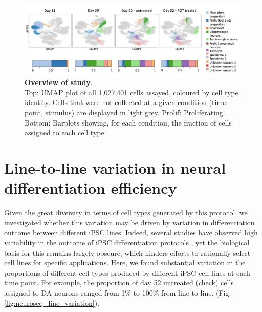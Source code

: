 \begin{figure}[h]
\centering
\includegraphics[width=17cm]{Chapter5/Fig/neuroseq_overview.png}
\caption[Overview of study]{\textbf{Overview of study}.\\
Top: UMAP plot of all 1,027,401 cells assayed, coloured by 
cell type identity. 
Cells that were not collected at a given condition (time point, stimulus) are displayed in light grey. 
Prolif: Proliferating. 
Bottom: Barplots showing, for each condition, the fraction of cells assigned to each cell type.}
\label{fig:neuroseq_overview}
\end{figure}


\newpage

\section{Line-to-line variation in neural differentiation efficiency}
\label{sec:neuroseq_diff_eff}

Given the great diversity in terms of cell types generated by this protocol, we investigated whether this variation may be driven by variation in differentiation outcome between different iPSC lines. 
Indeed, several studies have observed high variability in the outcome of iPSC differentiation protocols \cite{d2019association, volpato2018reproducibility}, yet the biological basis for this remains largely obscure, which hinders efforts to rationally select cell lines for specific applications. 
Here, we found substantial variation in the proportions of different cell types produced by different iPSC cell lines at each time point. 
For example, the proportion of day 52 untreated (check) cells assigned to DA neurons ranged from 1\% to 100\% from line to line.
(Fig. \ref{fig:neuroseq_line_variation}).

